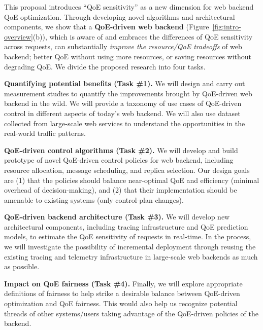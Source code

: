 
This proposal introduces ``QoE sensitivity'' as a new dimension for web backend QoE optimization.
Through developing novel algorithms and architectural components, we show that a {\bf QoE-driven web backend} (Figure~\ref{fig:intro-overview}(b)), which is aware of and embraces the differences of QoE sensitivity across requests, can substantially {\em improve the resource/QoE tradeoffs} of web backend; \ie better QoE without using more resources, or saving resources without degrading QoE. 
We divide the proposed research into four tasks.

\begin{packeditemize}
\item{\bf Quantifying potential benefits (Task \#1).}
We will design and carry out measurement studies to quantify the improvements brought by QoE-driven web backend in the wild. We will provide a taxonomy of use cases of QoE-driven control in different aspects of today's web backend. We will also use dataset collected from large-scale web services to understand the opportunities in the real-world traffic patterns.

\item{\bf QoE-driven control algorithms (Task \#2).}
We will develop and build prototype of novel QoE-driven control policies for web backend, including resource allocation, message scheduling, and replica selection. Our design goals are (1) that the policies should balance near-optimal QoE and efficiency (minimal overhead of decision-making), and (2) that their implementation should be amenable to existing systems (\eg only control-plan changes).

\item{\bf QoE-driven backend architecture (Task \#3).}
We will develop new architectural components, including tracing infrastructure and QoE prediction models, to estimate the QoE sensitivity of requests in real-time. In the process, we will investigate the possibility of incremental deployment through reusing the existing tracing and telemetry infrastructure in large-scale web backends as much as possible.

\item{\bf Impact on QoE fairness (Task \#4).}
Finally, we will explore appropriate definitions of fairness to help strike a desirable balance between QoE-driven optimization and QoE fairness. This would also help us recognize potential threads of other systems/users taking advantage of the QoE-driven policies of the backend.

\end{packeditemize}


